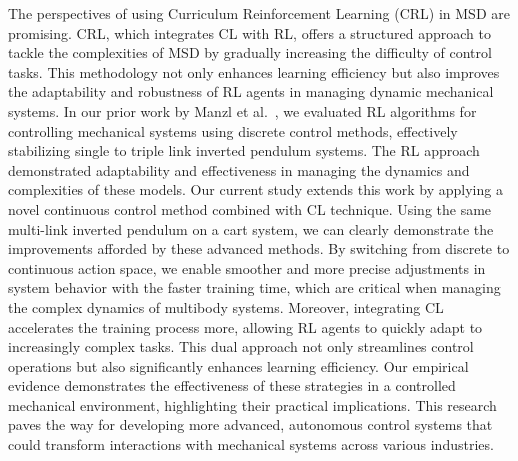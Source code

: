 The perspectives of using Curriculum Reinforcement Learning (CRL) in MSD are promising. CRL, which integrates CL with RL, offers a structured approach to tackle the complexities of MSD by gradually increasing the difficulty of control tasks. This methodology not only enhances learning efficiency but also improves the adaptability and robustness of RL agents in managing dynamic mechanical systems. In our prior work by Manzl et al.~\cite{manzl2023relrl}, we evaluated RL algorithms for controlling mechanical systems using discrete control methods, effectively stabilizing single to triple link inverted pendulum systems. The RL approach demonstrated adaptability and effectiveness in managing the dynamics and complexities of these models. Our current study extends this work by applying a novel continuous control method combined with CL technique. Using the same multi-link inverted pendulum on a cart system, we can clearly demonstrate the improvements afforded by these advanced methods. By switching from discrete to continuous action space, we enable smoother and more precise adjustments in system behavior with the faster training time, which are critical when managing the complex dynamics of multibody systems. Moreover, integrating CL accelerates the training process more, allowing RL agents to quickly adapt to increasingly complex tasks. This dual approach not only streamlines control operations but also significantly enhances learning efficiency. Our empirical evidence demonstrates the effectiveness of these strategies in a controlled mechanical environment, highlighting their practical implications. This research paves the way for developing more advanced, autonomous control systems that could transform interactions with mechanical systems across various industries.

